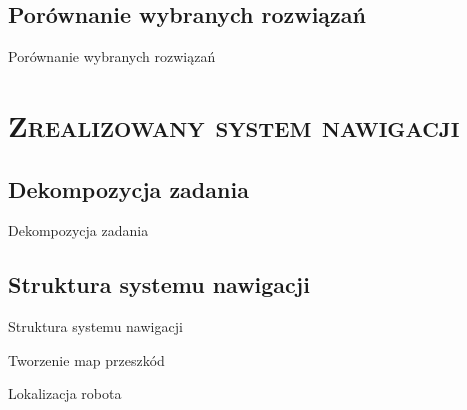 \documentclass[xcolor=x11names,compress]{beamer}
\renewcommand{\(}{\begin{columns}}
\renewcommand{\)}{\end{columns}}
\newcommand{\<}[1]{\begin{column}{#1}}
\renewcommand{\>}{\end{column}}
\begin{document}
\subsection{Porównanie wybranych rozwiązań}

\begin{frame}{Porównanie wybranych rozwiązań}

\end{frame}

\section{\scshape Zrealizowany system nawigacji}
\subsection{Dekompozycja zadania}
\begin{frame}{Dekompozycja zadania}

\end{frame}

\subsection{Struktura systemu nawigacji}

\begin{frame}{Struktura systemu nawigacji}

\end{frame}

\begin{frame}{Tworzenie map przeszkód}

\end{frame}

\begin{frame}{Lokalizacja robota}

\end{frame}
\end{document}
